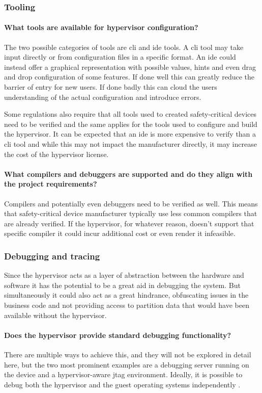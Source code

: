 \subsubsection{Tooling}
\paragraph{What tools are available for hypervisor configuration?}
The two possible categories of tools are \acrshort{cli} and \acrshort{ide} tools. A \acrshort{cli} tool may take input directly or from configuration files in a specific format. An \acrshort{ide} could instead offer a graphical representation with possible values, hints and even drag and drop configuration of some features. If done well this can greatly reduce the barrier of entry for new users. If done badly this can cloud the users understanding of the actual configuration and introduce errors.

Some regulations also require that all tools used to created safety-critical devices need to be verified and the same applies for the tools used to configure and build the hypervisor. It can be expected that an \acrshort{ide} is more expensive to verify than a \acrshort{cli} tool and while this may not impact the manufacturer directly, it may increase the cost of the hypervisor license.
\paragraph{What compilers and debuggers are supported and do they align with the project requirements?}
Compilers and potentially even debuggers need to be verified as well. This means that safety-critical device manufacturer typically use less common compilers that are already verified. If the hypervisor, for whatever reason, doesn't support that specific compiler it could incur additional cost or even render it infeasible.
\subsubsection{Debugging and tracing}
Since the hypervisor acts as a layer of abstraction between the hardware and software it has the potential to be a great aid in debugging the system. But simultaneously it could also act as a great hindrance, obfuscating issues in the business code and not providing access to partition data that would have been available without the hypervisor.
\paragraph{Does the hypervisor provide standard debugging functionality?}
There are multiple ways to achieve this, and they will not be explored in detail here, but the two most prominent examples are a debugging server running on the device and a hypervisor-aware \acrshort{jtag} environment. Ideally, it is possible to debug both the hypervisor and the guest operating systems independently \cite{Lauterbach.2018}. 
